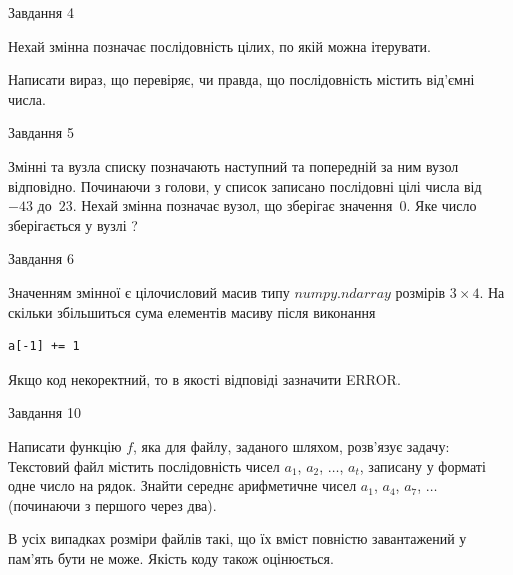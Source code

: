 \documentclass[12pt, ukrainian]{article}
\begin{document}
{               
{\begin{center}Завдання {4}\end{center}}
\vspace{-6mm}
Нехай змінна  позначає послідовність цілих, по якій можна ітерувати.

Написати вираз, що перевіряє, чи правда, що послідовність  містить від’ємні числа.\par

\vspace{10mm}
               
{\begin{center}Завдання {5}\end{center}}
\vspace{-6mm}
Змінні  та  вузла списку позначають наступний та попередній за ним вузол відповідно. Починаючи з голови, у список записано послідовні цілі числа від~$-43$ до~$23$. Нехай змінна  позначає вузол, що зберігає значення~$0$.
Яке число зберігається у вузлі  ?\par

               
{\begin{center}Завдання {6}\end{center}}
\vspace{-6mm}
Значенням змінної  є цілочисловий масив типу $numpy.ndarray$ розмірів $3{\times}4$. На скільки збільшиться сума елементів масиву  після виконання
\begin{verbatim}
a[-1] += 1
\end{verbatim}


Якщо код некоректний, то в якості відповіді зазначити ERROR.\par

               
{\begin{center}Завдання {10}\end{center}}
\vspace{-6mm}

Написати функцію $f$, яка для файлу, заданого шляхом, розв’язує задачу:\\ Текстовий файл містить послідовність чисел $a_1$, $a_2$, $\ldots$, $a_t$, записану у форматі одне число на рядок. Знайти середнє арифметичне чисел $a_1$, $a_4$, $a_7$, $\ldots$ (починаючи з першого через два).

В усіх випадках розміри файлів такі, що їх вміст повністю завантажений у пам'ять бути не може. Якість коду також оцінюється.



}
\end{document}
